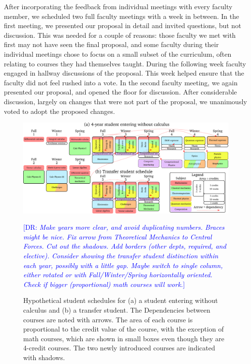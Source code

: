 \documentclass[english,aps,pra,reprint,noshowpacs,superscriptaddress]{revtex4-1}
\newcommand\davidsays[1]{\textcolor{blue}{[\sc DR: {\em#1}]}}
\begin{document}
After incorporating the feedback from  individual meetings with every
faculty member, we scheduled
two full faculty meetings with a week in between.  In the first meeting,
we presented our proposal in detail and invited questions, but not discussion.
This was needed for a couple of reasons:  those faculty we met with first
may not have seen the final proposal, and some faculty during their
individual meetings chose to focus on a small subset of the
curriculum, often relating to courses they had themselves taught.
During the following week faculty engaged in hallway discussions of the proposal.
This week helped ensure that the faculty did not feel rushed into a vote.
In the second faculty meeting, we again presented our proposal, and opened
the floor for discussion.  After considerable discussion, largely on
changes that were not part of the proposal, we unanimously voted to adopt
the proposed changes.

\newcommand\mathcourse[2]{\emph{#1}}
\newcommand\noted[2]{\textbf{#1} (#2)}
\newcommand\paradigm[1]{{\sc #1} (3)}
\newcommand\capstone[1]{#1 (3)}
\newcommand\onecredit[1]{#1 (1)}
\newcommand\threecredit[1]{#1 (3)}
\newcommand\fourcredit[1]{#1 (4)}

\begin{figure}
\includegraphics[width=\textwidth]{schedule}
\caption{Hypothetical student schedules for (a) a student entering
  without calculus and (b) a transfer student.  The Dependencies
  between courses are noted with arrows.  The area of each course is
  proportional to the credit value of the course, with the exception
  of math courses, which are shown in small boxes even though they are
  4-credit courses.  The two newly introduced courses are indicated
  with shadows.\label{fig:schedule}}
  \davidsays{Make years more clear, and avoid duplicating numbers.  Braces might be nice.
  Fix arrow from Theoretical Mechanics to Central Forces.  Cut out the shadows.
  Add borders (other depts, required, and elective).  Consider showing the transfer
  student distinction within each year, possibly with a little gap.  Maybe switch to single
  column, either rotated or with Fall/Winter/Spring horizontally oriented.
  Check if bigger (proportional) math courses will work.}
\end{figure}
\end{document}
